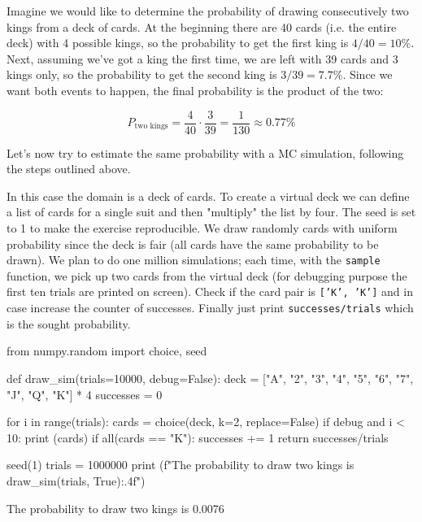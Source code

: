 Imagine we would like to determine the probability of drawing consecutively two kings from a deck of cards. At the beginning there are 40 cards (i.e. the entire deck) with 4 possible kings, so the probability to get the first king is $4/40=10\%$. Next, assuming we've got a king the first time, we are left with 39 cards and 3 kings only, so the probability to get the second king is $3/39=7.7\%$. Since we want both events to happen, the final probability is the product of the two:

\begin{equation*}
P_\textrm{two kings} = \frac{4}{40} \cdot \frac{3}{39} = \frac{1}{130} \approx 0.77\%
\end{equation*}

Let's now try to estimate the same probability with a MC simulation, following the steps outlined above.

In this case the domain is a deck of cards. To create a virtual deck we can define a list of cards for a single suit and then "multiply" the list by four. The seed is set to 1 to make the exercise reproducible.
We draw randomly cards with uniform probability since the deck is fair (all cards have the same probability to be drawn). 
We plan to do one million simulations; each time, with the \texttt{sample} function, we pick up two cards from the virtual deck (for debugging purpose the first ten trials are printed on screen). Check if the card pair is \texttt{['K', 'K']} and in case increase the counter of successes. Finally just print \texttt{successes/trials} which is the sought probability.

\begin{ipython}
from numpy.random import choice, seed

def draw_sim(trials=10000, debug=False):
    deck = ["A", "2", "3", "4", "5", "6", "7", "J", "Q", "K"] * 4
    successes = 0

    for i in range(trials):
        cards = choice(deck, k=2, replace=False)
        if debug and i < 10:
            print (cards)
        if all(cards == "K"):
            successes += 1
    return successes/trials
            
seed(1)
trials = 1000000        
print (f"The probability to draw two kings is {draw_sim(trials, True):.4f}")
\end{ipython}
\begin{ioutput}
['3' '2']
['2' '3']
['7' '3']
['Q' '4']
['7' '5']
['5' 'J']
['4' 'K']
['K' '2']
['5' 'Q']
['A' 'J']

The probability to draw two kings is 0.0076
\end{ioutput}

